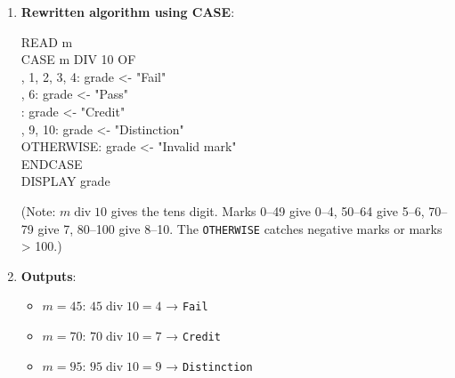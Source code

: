 \documentclass[11pt]{article}
\begin{document}
\begin{corrige}
\begin{enumerate}
\item \textbf{Rewritten algorithm using CASE}:
\begin{flushleft}\ttfamily\small
READ m\\
CASE m DIV 10 OF\\
, 1, 2, 3, 4: grade <- "Fail"\\
, 6:        grade <- "Pass"\\
:           grade <- "Credit"\\
, 9, 10:    grade <- "Distinction"\\
\quad OTHERWISE:   grade <- "Invalid mark"\\
ENDCASE\\
DISPLAY grade
\end{flushleft}
(Note: $m \operatorname{div} 10$ gives the tens digit. Marks 0–49 give 0–4, 50–64 give 5–6, 70–79 give 7, 80–100 give 8–10. The \texttt{OTHERWISE} catches negative marks or marks > 100.)
\item \textbf{Outputs}:
\begin{itemize}
\item $m = 45$: $45 \operatorname{div} 10 = 4$ → \texttt{Fail}
\item $m = 70$: $70 \operatorname{div} 10 = 7$ → \texttt{Credit}
\item $m = 95$: $95 \operatorname{div} 10 = 9$ → \texttt{Distinction}
\end{itemize}
\end{enumerate}
\end{corrige}
\end{document}
